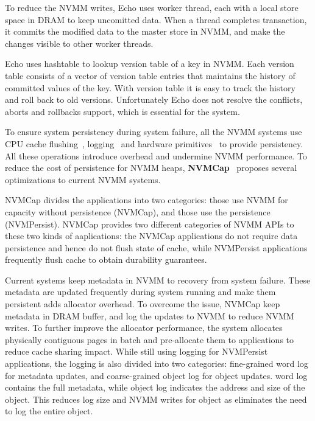 To reduce the NVMM writes, Echo uses worker thread, each with a local store
space in DRAM to keep uncomitted data.
When a thread completes transaction, it commits the modified
data to the master store in NVMM, and make the changes visible to other
worker threads.

Echo uses hashtable to lookup version table of a key in NVMM. Each version table
consists of a vector of version table entries that maintains the history
of committed values of the key. With version table it is easy to track
the history and roll back to old versions. Unfortunately Echo does not
resolve the conflicts, aborts and rollbacks support, which is essential
for the system.

To ensure system persistency during system failure, all the NVMM systems
use CPU cache flushing~\cite{PMFS, nvheaps}, logging~\cite{PMFS, nvheaps,
mnemosyne} and hardware primitives~\cite{BPFS, PMFS} to provide persistency.
All these operations introduce overhead and undermine NVMM performance.
To reduce the cost of persistence for NVMM heaps, \textbf{NVMCap}~\cite{NVMCap}
 proposes several optimizations to current NVMM systems.

NVMCap divides the applications into two categories: those
use NVMM for capacity without persistence (NVMCap), and those use the
persistence (NVMPersist). NVMCap provides two different
categories of NVMM APIs to these two kinds of aaplications: the NVMCap
applications do not require data persistence and hence do not flush state
of cache, while NVMPersist applications frequently flush cache to obtain
durability guarantees.

Current systems keep metadata in NVMM to recovery from system failure.
These metadata are updated frequently during system running and make
them persistent adds allocator overhead. To overcome the issue, NVMCap
keep metadata in DRAM buffer, and log the updates to NVMM to reduce NVMM
writes. To further improve the allocator performance, the system allocates
physically contiguous pages in batch and pre-allocate them to applications 
to reduce cache sharing impact. While still using logging for NVMPersist
applications, the logging is also divided into two categories: fine-grained
word log for metadata updates, and coarse-grained object log for object
updates. word log contains the full metadata, while object log indicates
the address and size of the object. This reduces log size and NVMM writes for
object as eliminates the need to log the entire object.
